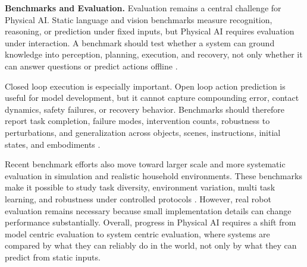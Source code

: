 \noindent\textbf{Benchmarks and Evaluation.}
Evaluation remains a central challenge for Physical AI. 
Static language and vision benchmarks measure recognition, reasoning, or prediction under fixed inputs, but Physical AI requires evaluation under interaction. 
A benchmark should test whether a system can ground knowledge into perception, planning, execution, and recovery, not only whether it can answer questions or predict actions offline \citep{srivastavabehavior,li2023behavior,liigibson,shen2021igibson,li2024embodied,yang2025embodiedbench}.

Closed loop execution is especially important. 
Open loop action prediction is useful for model development, but it cannot capture compounding error, contact dynamics, safety failures, or recovery behavior. 
Benchmarks should therefore report task completion, failure modes, intervention counts, robustness to perturbations, and generalization across objects, scenes, instructions, initial states, and embodiments \citep{liu2023libero,fei2025libero,zhou2025libero,fang2026molmoact2}.

Recent benchmark efforts also move toward larger scale and more systematic evaluation in simulation and realistic household environments. 
These benchmarks make it possible to study task diversity, environment variation, multi task learning, and robustness under controlled protocols \citep{zhu2020robosuite,nasiriany2024robocasa,nasiriany2026robocasa365,yang2026robolab}. 
However, real robot evaluation remains necessary because small implementation details can change performance substantially. 
Overall, progress in Physical AI requires a shift from model centric evaluation to system centric evaluation, where systems are compared by what they can reliably do in the world, not only by what they can predict from static inputs.